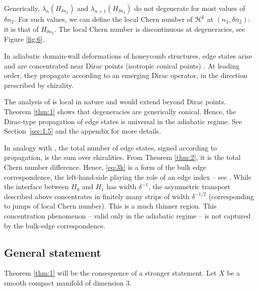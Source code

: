 \documentclass[11pt]{article}
\numberwithin{equation}{section}
\let\pazocal\EuScript
\theoremstyle{definition}
\newcommand{\HH}{\pazocal{H}}
\begin{document}
Generically, $\lambda_n(H_{\delta n_2})$ and $\lambda_{n+1}(H_{\delta n_2})$ do not degenerate for most values of $\delta n_2$. For such values, we can define the local Chern number of $\HH^\delta$ at $(n_1,\delta n_2)$: it is that of $H_{\delta n_2}$. The local Chern number is discontinuous at degeneracies, see Figure \ref{fig:6}.

In adiabatic domain-wall deformations of honeycomb structures, edge states arise and are concentrated near Dirac points (isotropic conical points) \cite{FLW16,LWZ17,D19a,DW19}. At leading order, they propagate according to an emerging Dirac operator, in the direction prescribed by chirality.

The analysis of \cite{FLW16,LWZ17,D19a,DW19} is local in nature and would extend beyond Dirac points. Theorem \ref{thm:1} shows that degeneracies are generically conical. Hence, the Dirac-type propagation of edge states is universal in the adiabatic regime. See Section~\ref{sec:1.5} and the appendix for more details.

In analogy with \cite{D19a,D19b,DW19}, the total number of edge states, signed according to propagation, is the sum over chiralities. From Theorem \ref{thm:2}, it is the total Chern number difference. Hence, \eqref{eq:3k} is a form of the bulk edge correspondence, the left-hand-side playing the role of an edge index -- see \cite{H93,KRS02,EGS05,ASV13,GP13,PS16,BKR17,D19c}. While the interface between $H_0$ and $H_1$ has width $\delta^{-1}$, the asymmetric transport described above concentrates in finitely many strips of width $\delta^{-1/2}$ (corresponding to jumps of local Chern number). This is a much thinner region. This concentration phenomenon -- valid only in the adiabatic regime -- is not captured by the bulk-edge correspondence.

\subsection{General statement}\label{sec:1.4} Theorem \ref{thm:1} will be the consequence of a stronger statement. Let $X$ be a smooth compact manifold of dimension 3.
\end{document}
